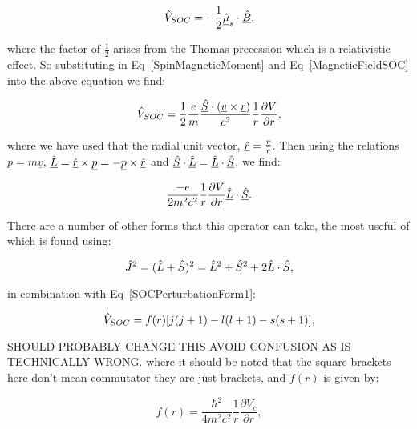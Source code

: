 \begin{equation}
    \Hat{V}_{SOC} = - \frac{1}{2} \underline{\Hat{\mu}}_s \cdot \underline{\Hat{B}},
    \label{SOCPerturbation}
\end{equation}

\noindent where the factor of $\frac{1}{2}$ arises from the Thomas precession which is a relativistic effect. So substituting in Eq~\ref{SpinMagneticMoment} and Eq~\ref{MagneticFieldSOC} into the above equation we find:

\begin{equation}
    \Hat{V}_{SOC} = \frac{1}{2} \frac{e}{m} \frac{\underline{\Hat{S}} \cdot (\underline{v} \times \underline{r})}{c^2} \frac{1}{r} \frac{\partial V}{\partial r},
\end{equation}

\noindent where we have used that the radial unit vector, $\underline{\Hat{r}} = \frac{\underline{r}}{r}$. Then using the relations $\underline{p} = m \underline{v}$, $\underline{\Hat{L}} = \underline{\Hat{r}} \times \underline{p} = - \underline{p} \times \underline{\Hat{r}}$ and $\underline{\Hat{S}} \cdot \underline{\Hat{L}} = \underline{\Hat{L}} \cdot \underline{\Hat{S}}$, we find:

\begin{equation}
    \frac{-e}{2m^2c^2} \frac{1}{r} \frac{\partial V}{\partial r} \underline{\Hat{L}} \cdot \underline{\Hat{S}}.
    \label{SOCPerturbationForm1}
\end{equation}

\noindent There are a number of other forms that this operator can take, the most useful of which is found using:

\begin{equation}
    \Hat{J}^2 = (\Hat{L} + \Hat{S})^2 = \Hat{L}^2 + \Hat{S}^2 + 2 \Hat{L} \cdot \Hat{S},
    \label{TotalAngularMomentumExpansion}
\end{equation}

\noindent in combination with Eq~\ref{SOCPerturbationForm1}:

\begin{equation}
    \Hat{V}_{SOC} = f(r)[j(j + 1) - l(l + 1) - s(s + 1)],
    \label{SOCPerturbationForm2}
\end{equation}

\noindent SHOULD PROBABLY CHANGE THIS AVOID CONFUSION AS IS TECHNICALLY WRONG. where it should be noted that the square brackets here don't mean commutator they are just brackets, and $f(r)$ is given by:

\begin{equation}
    f(r) = \frac{\hbar^2}{4m^2c^2} \frac{1}{r} \frac{\partial V_c}{\partial r},
    \label{f(r)Form}
\end{equation}

